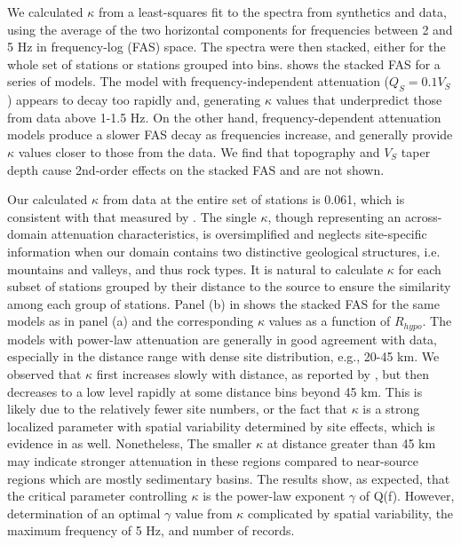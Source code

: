 We calculated $\kappa$ from a least-squares fit to the spectra from synthetics and data, using the average of the two horizontal components for frequencies between 2 and 5 Hz in frequency-log (FAS) space. The spectra were then stacked, either for the whole set of stations or stations grouped into bins. 
 shows the stacked FAS for a series of models.  The model with frequency-independent attenuation ($Q_S=0.1V_S$) appears to decay too rapidly and, generating $\kappa$ values that underpredict those from data above 1-1.5 Hz. On the other hand, frequency-dependent attenuation models produce a slower FAS decay as frequencies increase, and generally provide $\kappa$ values closer to those from the data. We find that topography and $V_S$ taper depth cause 2nd-order effects on the stacked FAS and are not shown.

Our calculated $\kappa$ from data at the entire set of stations is 0.061, which is consistent with that measured by \citet{anderson1984model}. The single $\kappa$, though representing an across-domain attenuation characteristics, is oversimplified and neglects site-specific information when our domain contains two distinctive geological structures, i.e. mountains and valleys, and thus rock types. It is natural to calculate $\kappa$ for each subset of stations grouped by their distance to the source to ensure the similarity among each group of stations. Panel (b) in  shows the stacked FAS for the same models as in panel (a) and the corresponding $\kappa$ values as a function of $R_{hypo}$. The models with power-law attenuation are generally in good agreement with data, especially in the distance range with dense site distribution, e.g., 20-45 km. We observed that $\kappa$ first increases slowly with distance, as reported by \citet{anderson1984model}, but then decreases to a low level rapidly at some distance bins beyond 45 km. This is likely due to the relatively fewer site numbers, or the fact that $\kappa$ is a strong localized parameter with spatial variability determined by site effects, which is evidence in \citet{anderson1984model} as well. Nonetheless, The smaller $\kappa$ at distance greater than 45 km may indicate stronger attenuation in these regions compared to near-source regions which are mostly sedimentary basins.
The results show, as expected, that the
critical parameter controlling $\kappa$ is the power-law exponent $\gamma$ of Q(f). However, determination of an optimal $\gamma$ value from $\kappa$ complicated by spatial variability, the maximum frequency of 5 Hz, and number of records.


